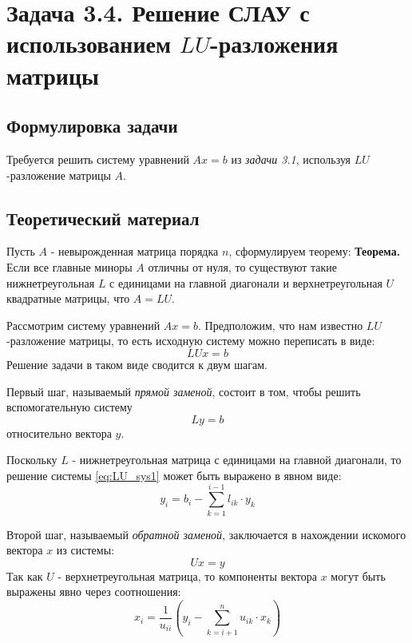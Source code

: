 \documentclass[12pt]{article}%
\begin{document}
\newpage
\section{Задача 3.4. Решение СЛАУ с использованием $LU$-разложения матрицы}
\subsection{Формулировка задачи}
Требуется решить систему уравнений $Ax=b$ из \textit{задачи 3.1}, используя $LU$-разложение матрицы $A$.
\subsection{Теоретический материал}
Пусть $A$ -  невырожденная матрица порядка $n$, сформулируем теорему:
\newline
\textbf{Теорема.} Если все главные миноры $A$ отличны от нуля, то существуют такие нижнетреугольная $L$ с единицами на главной диагонали и верхнетреугольная $U$ квадратные матрицы, что $A = LU$.

Рассмотрим систему уравнений $Ax=b$. Предположим, что нам известно $LU$-разложение матрицы, то есть исходную систему можно переписать в виде:
\begin{equation*}
    LUx = b
\end{equation*}
Решение задачи в таком виде сводится к двум шагам.

Первый шаг, называемый \textit{прямой заменой}, состоит в том, чтобы решить вспомогательную систему
\begin{equation}\label{eq:LU_sys1}
    Ly = b
\end{equation}
относительно вектора $y$. 

Поскольку $L$ - нижнетреугольная матрица с единицами на главной диагонали, то решение системы \ref{eq:LU_sys1} может быть выражено в явном виде:
\begin{equation}\label{eq:LU_sol1}
    y_{i} = b_{i} - \sum\limits_{k=1}^{i-1}l_{ik} \cdot y_{k}
\end{equation}

Второй шаг, называемый \textit{обратной заменой}, заключается в нахождении искомого вектора $x$ из системы:
\begin{equation}
    Ux = y
\end{equation}
Так как $U$ - верхнетреугольная матрица, то компоненты вектора $x$ могут быть выражены явно через соотношения:
\begin{equation}\label{eq:LU_sol2}
    x_{i} = \frac{1}{u_{ii}}\left(
    y_{i} - \sum\limits_{k=i+1}^{n} u_{ik} \cdot  x_{k}
    \right)
\end{equation}
\end{document}
